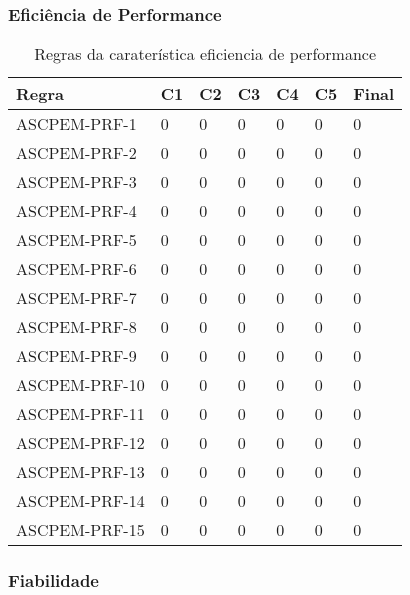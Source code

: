 \documentclass[openany,10pt,a4paper]{article}
\begin{document}
\subsubsection{Eficiência de Performance}

\begin{longtable}{p{1.3in}|p{0.28in}|p{0.28in}|p{0.28in}|p{0.28in}|p{0.28in}|p{0.35in}}
	\caption{Regras da caraterística eficiencia de performance}
	\label{variability_impl_mech}
	\endhead
	\hline	
	\textbf{Regra} & \textbf{C1} & \textbf{C2} & \textbf{C3} & \textbf{C4} & \textbf{C5} & \textbf{Final} \\ \hline
ASCPEM-PRF-1 & 0 & 0 & 0 & 0 & 0 & 0 \\ \hline
ASCPEM-PRF-2 & 0 & 0 & 0 & 0 & 0 & 0 \\ \hline
ASCPEM-PRF-3 & 0 & 0 & 0 & 0 & 0 & 0 \\ \hline
ASCPEM-PRF-4 & 0 & 0 & 0 & 0 & 0 & 0 \\ \hline
ASCPEM-PRF-5 & 0 & 0 & 0 & 0 & 0 & 0 \\ \hline
ASCPEM-PRF-6 & 0 & 0 & 0 & 0 & 0 & 0 \\ \hline
ASCPEM-PRF-7 & 0 & 0 & 0 & 0 & 0 & 0 \\ \hline
ASCPEM-PRF-8 & 0 & 0 & 0 & 0 & 0 & 0 \\ \hline
ASCPEM-PRF-9 & 0 & 0 & 0 & 0 & 0 & 0 \\ \hline
ASCPEM-PRF-10 & 0 & 0 & 0 & 0 & 0 & 0 \\ \hline
ASCPEM-PRF-11 & 0 & 0 & 0 & 0 & 0 & 0 \\ \hline
ASCPEM-PRF-12 & 0 & 0 & 0 & 0 & 0 & 0 \\ \hline
ASCPEM-PRF-13 & 0 & 0 & 0 & 0 & 0 & 0 \\ \hline
ASCPEM-PRF-14 & 0 & 0 & 0 & 0 & 0 & 0 \\ \hline
ASCPEM-PRF-15 & 0 & 0 & 0 & 0 & 0 & 0 \\ \hline
	\end{longtable} 


\subsubsection{Fiabilidade}
\end{document}
